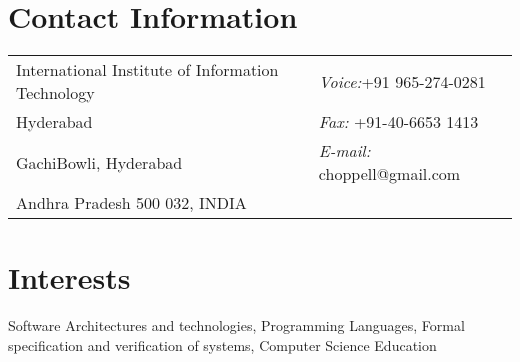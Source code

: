\documentclass[11pt,margin,line]{res}
\begin{document}

\begin{resume}
\section{\sc Contact Information}
\vspace{.05in}
\begin{tabular}{@{}p{3.5in}p{3in}}
International Institute of Information  Technology  & {\it Voice:}+91 965-274-0281\\
Hyderabad                     &{\it Fax:}    +91-40-6653 1413\\
GachiBowli, Hyderabad        & {\it E-mail:}  choppell@gmail.com\\ 
Andhra Pradesh 500 032, INDIA            & %
\\     
\end{tabular}



\section{\sc Interests}
Software Architectures and technologies, Programming
Languages, Formal specification and verification of systems,
Computer Science Education


\end{resume}
\end{document}
